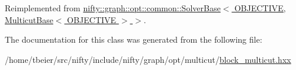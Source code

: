 Reimplemented from \hyperlink{classnifty_1_1graph_1_1opt_1_1common_1_1SolverBase_a6a5d77ee514c4b5f44d1908c1000f0ff}{nifty\+::graph\+::opt\+::common\+::\+Solver\+Base$<$ O\+B\+J\+E\+C\+T\+I\+V\+E, Multicut\+Base$<$ O\+B\+J\+E\+C\+T\+I\+V\+E $>$ $>$}.



The documentation for this class was generated from the following file\+:\begin{DoxyCompactItemize}
\item 
/home/tbeier/src/nifty/include/nifty/graph/opt/multicut/\hyperlink{block__multicut_8hxx}{block\+\_\+multicut.\+hxx}\end{DoxyCompactItemize}
